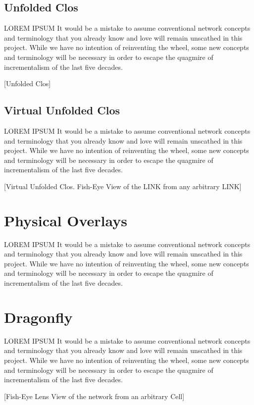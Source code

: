 \documentclass[../../../OAE-SPEC-MAIN.tex]{subfiles}
\begin{document}
\subsection{Unfolded Clos}

LOREM IPSUM It would be a mistake to assume conventional network concepts and terminology that you already know and love will remain unscathed in this project. While we have no intention of reinventing the wheel,  some new concepts and terminology will be necessary in order to escape the quagmire of incrementalism of the last five decades.  

[Unfolded Clos]

\subsection{Virtual Unfolded Clos}

LOREM IPSUM It would be a mistake to assume conventional network concepts and terminology that you already know and love will remain unscathed in this project. While we have no intention of reinventing the wheel,  some new concepts and terminology will be necessary in order to escape the quagmire of incrementalism of the last five decades.  

[Virtual Unfolded Clos. Fish-Eye View of the LINK from any arbitrary LINK]


\section{Physical Overlays}

LOREM IPSUM It would be a mistake to assume conventional network concepts and terminology that you already know and love will remain unscathed in this project. While we have no intention of reinventing the wheel,  some new concepts and terminology will be necessary in order to escape the quagmire of incrementalism of the last five decades.  

\section{Dragonfly}

LOREM IPSUM It would be a mistake to assume conventional network concepts and terminology that you already know and love will remain unscathed in this project. While we have no intention of reinventing the wheel,  some new concepts and terminology will be necessary in order to escape the quagmire of incrementalism of the last five decades.  

[Fish-Eye Lens View of the network from an arbitrary Cell]
      \vspace{2em}
\end{document}
